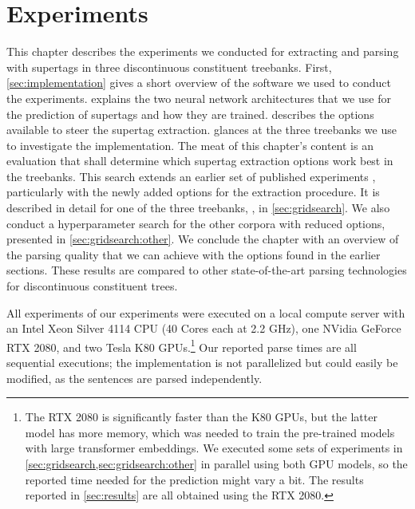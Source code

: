 \documentclass[../document.tex]{subfiles}
\begin{document}
    \chapter{Experiments}\label{sec:experiments}
    This chapter describes the experiments we conducted for extracting and parsing with supertags in three discontinuous constituent treebanks.
    First, \cref{sec:implementation} gives a short overview of the software we used to conduct the experiments.
     explains the two neural network architectures that we use for the prediction of supertags and how they are trained.
     describes the options available to steer the supertag extraction.
     glances at the three treebanks we use to investigate the implementation.
    The meat of this chapter's content is an evaluation that shall determine which supertag extraction options work best in the treebanks.
    This search extends an earlier set of published experiments \citep{Rup22}, particularly with the newly added options for the extraction procedure.
    It is described in detail for one of the three treebanks, \negra{}, in \cref{sec:gridsearch}.
    We also conduct a hyperparameter search for the other corpora with reduced options, presented in \cref{sec:gridsearch:other}.
    We conclude the chapter with an overview of the parsing quality that we can achieve with the options found in the earlier sections.
    These results are compared to other state-of-the-art parsing technologies for discontinuous constituent trees.

    All experiments of our experiments were executed on a local compute server with an Intel Xeon Silver 4114 CPU (40 Cores each at 2.2 GHz), one NVidia GeForce RTX 2080, and two Tesla K80 GPUs.\footnote{
        The RTX 2080 is significantly faster than the K80 GPUs, but the latter model has more memory, which was needed to train the pre-trained models with large transformer embeddings.
        We executed some sets of experiments in \cref{sec:gridsearch,sec:gridsearch:other} in parallel using both GPU models, so the reported time needed for the prediction might vary a bit.
        The results reported in \cref{sec:results} are all obtained using the RTX 2080.
    }
    Our reported parse times are all sequential executions; the implementation is not parallelized but could easily be modified, as the sentences are parsed independently.

    
    
    
    
    
    
    

    \ifSubfilesClassLoaded{%
        \printindex
    }{}
\end{document}
